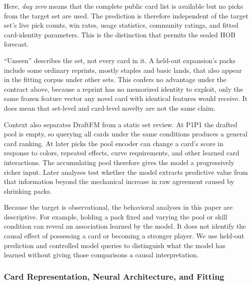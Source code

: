 \documentclass[11pt]{article}
\numberwithin{equation}{section}
\begin{document}
Here, \emph{day zero} means that the complete public card list is available but
no picks from the target set are used. The prediction is therefore independent
of the target set's live pick counts, win rates, usage statistics, community
ratings, and fitted card-identity parameters. This is the distinction that
permits the sealed HOB forecast.

``Unseen'' describes the set, not every card in it. A held-out expansion's packs
include some ordinary reprints, mostly staples and basic lands, that also appear
in the fitting corpus under other sets. This confers no advantage under the
contract above, because a reprint has no memorized identity to exploit, only the
same frozen feature vector any novel card with identical features would receive.
It does mean that set-level and card-level novelty are not the same claim.

Context also separates DraftFM from a static set review. At P1P1 the drafted
pool is empty, so querying all cards under the same conditions produces a
general card ranking. At later picks the pool encoder can change a card's score
in response to colors, repeated effects, curve requirements, and other learned
card interactions. The accumulating pool therefore gives the model a
progressively richer input. Later analyses test whether the model extracts
predictive value from that information beyond the mechanical increase in raw
agreement caused by shrinking packs.

Because the target is observational, the behavioral analyses in this paper are
descriptive. For example, holding a pack fixed and varying the pool or skill
condition can reveal an association learned by the model. It does not identify
the causal effect of possessing a card or becoming a stronger player. We use
held-out prediction and controlled model queries to distinguish what the model
has learned without giving those comparisons a causal interpretation.

\subsubsection{Card Representation, Neural Architecture, and Fitting}
\label{sec:card-representation}
\end{document}
